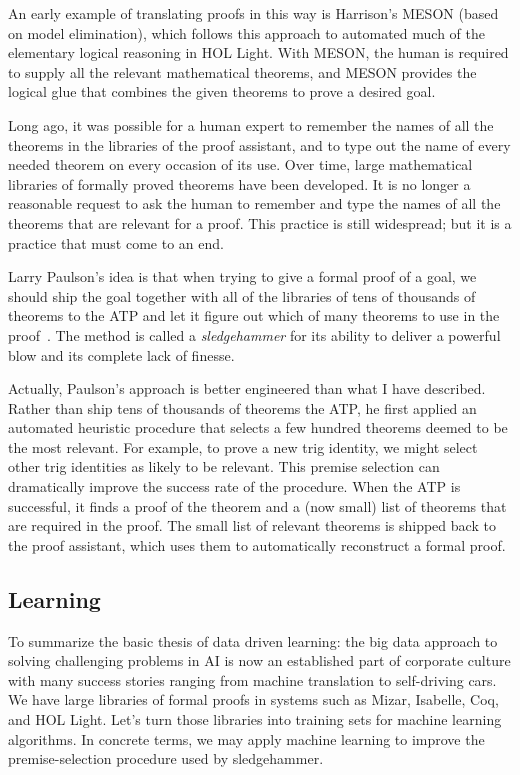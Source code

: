 \documentclass[brochure,english,12pt]{bourbaki}
\theoremstyle{plain}
\begin{document}
An early example of translating proofs in this way is Harrison's MESON (based on model elimination), 
which follows this approach
to automated much of the elementary logical reasoning in HOL Light.  With MESON, the human
is required to supply all the relevant mathematical theorems, and MESON provides the logical
glue that combines the given theorems to prove a desired goal.   

Long ago, it was possible for a human expert to remember the names of all the theorems in the libraries
of the proof assistant, and to type out the name of every needed theorem on every occasion of its use.
Over time, large  mathematical libraries of formally proved theorems have been developed.  It is no longer
a reasonable request to ask the human to remember and type the names of all the theorems that are relevant
for a proof.  
This practice is still widespread; but it is a practice that must come to an end.

Larry Paulson's idea is that when trying to give a formal proof 
of a goal, we should
ship the goal together with all of the libraries of tens of thousands of theorems to the ATP
and let it figure out which of many theorems to use in the proof~\cite{Paar}.  
The method is called a {\it sledgehammer}  for its ability to deliver a powerful blow and its complete lack of finesse.

Actually, Paulson's approach is better engineered than what I have described.  Rather than ship tens of thousands
of theorems the ATP, 
he first applied an automated heuristic procedure that selects a few hundred theorems
deemed to be the most relevant.  For example, to prove a new trig identity, we might select other
trig identities as likely to be relevant.  This premise selection  can dramatically
improve the success rate of the procedure.  When the ATP is successful, it finds
a proof of the theorem and a (now small) list of theorems that are required in the proof.  
The small list of relevant theorems is shipped back to the proof assistant, which uses them to automatically
reconstruct a formal proof.

\subsection{Learning}


To summarize the basic thesis of data driven learning: the big data approach to solving
challenging problems in AI is now  an established part of corporate
culture with many success stories ranging from machine translation to self-driving cars.
We have large libraries of formal proofs in systems such
as Mizar, Isabelle, Coq, and HOL Light.  
Let's turn those libraries into training sets for machine learning algorithms.
In concrete terms, we may apply machine learning to improve the premise-selection procedure
used by sledgehammer.  
\end{document}
